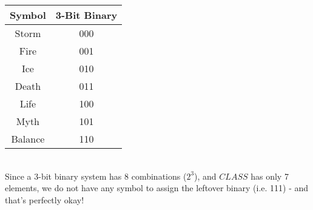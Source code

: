 \documentclass{article}
\begin{document}
\begin{enumerate}
\begin{center}
        \vspace{\baselineskip}
        \begin{tabular}{|c|c|}
            \hline
            Symbol & 3-Bit Binary \\
            \hline
            Storm & 000 \\
            Fire & 001 \\
            Ice & 010 \\
            Death & 011 \\
            Life & 100 \\
            Myth & 101 \\
            Balance & 110 \\
            \hline
          \end{tabular} \\
          \vspace{\baselineskip}
          Since a 3-bit binary system has 8 combinations ($2^3$), and $CLASS$ has only 7 elements, we do not have any symbol to assign the leftover binary (i.e. 111) - and that's perfectly okay!
    \end{center}
\end{enumerate}
\end{document}
